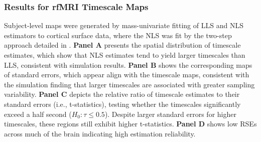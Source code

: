 \documentclass[docs/main.tex]{subfiles}
\begin{document}
\subsubsection{Results for rfMRI Timescale Maps}
Subject-level maps were generated by mass-univariate fitting of LLS and NLS estimators to cortical surface data, where the NLS was fit by the two-step approach detailed in . \textbf{Panel A} presents the spatial distribution of timescale estimates, which show that NLS estimates tend to yield larger timescales than LLS, consistent with simulation results. \textbf{Panel B} shows the corresponding maps of standard errors, which appear align with the timescale maps, consistent with the simulation finding that larger timescales are associated with greater sampling variability. \textbf{Panel C} depicts the relative ratio of timescale estimates to their standard errors (i.e., t-statistics), testing whether the timescales significantly exceed a half second ($H_0: \tau \leq 0.5$). Despite larger standard errors for higher timescales, these regions still exhibit higher t-statistics. \textbf{Panel D} shows low RSEs across much of the brain indicating high estimation reliability. \\
\end{document}
